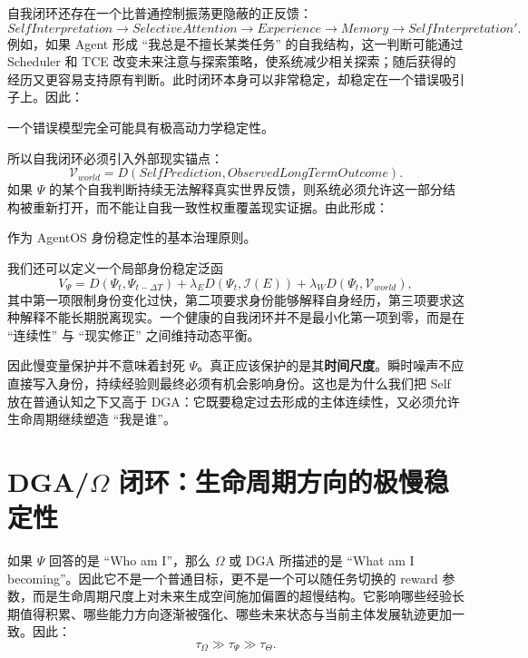 自我闭环还存在一个比普通控制振荡更隐蔽的正反馈：
\[
SelfInterpretation
\rightarrow
SelectiveAttention
\rightarrow
Experience
\rightarrow
Memory
\rightarrow
SelfInterpretation'.
\]
例如，如果 Agent 形成 ``我总是不擅长某类任务'' 的自我结构，这一判断可能通过 Scheduler 和 TCE 改变未来注意与探索策略，使系统减少相关探索；随后获得的经历又更容易支持原有判断。此时闭环本身可以非常稳定，却稳定在一个错误吸引子上。因此：
\begin{statementbox}
\centering
{}
\end{statementbox}
一个错误模型完全可能具有极高动力学稳定性。

所以自我闭环必须引入外部现实锚点：
\[
\mathcal V_{world}
=
D
\left(
SelfPrediction,
ObservedLongTermOutcome
\right).
\]
如果 $\Psi$ 的某个自我判断持续无法解释真实世界反馈，则系统必须允许这一部分结构被重新打开，而不能让自我一致性权重覆盖现实证据。由此形成：
\begin{statementbox}
\centering
{}
\end{statementbox}
作为 AgentOS 身份稳定性的基本治理原则。

我们还可以定义一个局部身份稳定泛函
\[
V_\Psi
=
D(\Psi_t,\Psi_{t-\Delta T})
+
\lambda_E D(\Psi_t,\mathcal I(E))
+
\lambda_W D(\Psi_t,\mathcal V_{world}),
\]
其中第一项限制身份变化过快，第二项要求身份能够解释自身经历，第三项要求这种解释不能长期脱离现实。一个健康的自我闭环并不是最小化第一项到零，而是在 ``连续性'' 与 ``现实修正'' 之间维持动态平衡。

因此慢变量保护并不意味着封死 $\Psi$。真正应该保护的是其\textbf{时间尺度}。瞬时噪声不应直接写入身份，持续经验则最终必须有机会影响身份。这也是为什么我们把 Self 放在普通认知之下又高于 DGA：它既要稳定过去形成的主体连续性，又必须允许生命周期继续塑造 ``我是谁''。

\section{DGA/$\Omega$ 闭环：生命周期方向的极慢稳定性}

如果 $\Psi$ 回答的是 ``Who am I''，那么 $\Omega$ 或 DGA 所描述的是 ``What am I becoming''。因此它不是一个普通目标，更不是一个可以随任务切换的 reward 参数，而是生命周期尺度上对未来生成空间施加偏置的超慢结构。它影响哪些经验长期值得积累、哪些能力方向逐渐被强化、哪些未来状态与当前主体发展轨迹更加一致。因此：
\[
\tau_\Omega
\gg
\tau_\Psi
\gg
\tau_\Theta.
\]

